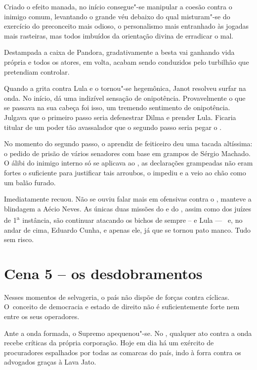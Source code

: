 Criado o efeito manada, no início consegue"-se manipular a coesão contra
o inimigo comum, levantando o grande véu debaixo do qual misturam"-se do
exercício do preconceito mais odioso, o personalismo mais entranhado às
jogadas mais rasteiras, mas todos imbuídos da orientação divina de
erradicar o mal.

Destampada a caixa de Pandora, gradativamente a besta vai ganhando vida
própria e todos os atores, em volta, acabam sendo conduzidos pelo
turbilhão que pretendiam controlar.

Quando a grita contra Lula e o  tornou"-se hegemônica, Janot resolveu
surfar na onda. No início, dá uma indizível sensação de onipotência.
Provavelmente o que se passava na sua cabeça foi isso, um tremendo
sentimento de onipotência. Julgava que o primeiro passo seria
defenestrar Dilma e prender Lula. Ficaria titular de um poder tão
avassalador que o segundo passo seria pegar o .

No momento do segundo passo, o aprendiz de feiticeiro deu uma tacada
altíssima: o pedido de prisão de vários senadores com base em grampos de
Sérgio Machado. O álibi do inimigo interno só se aplicava ao , as
declarações grampeadas não eram fortes o suficiente para justificar tais
arroubos, o  impediu e a  veio ao chão como um balão furado.

Imediatamente recuou. Não se ouviu falar mais em ofensivas contra o
, manteve a blindagem a Aécio Neves. As únicas duas missões do  e
do , assim como dos juízes de 1\textsuperscript{a~}instância, são
continuar atacando os bichos de sempre --  e Lula --- ~e, no andar de
cima, Eduardo Cunha, e apenas ele, já que se tornou pato manco. Tudo sem
risco.

\section{Cena 5 -- os desdobramentos}

Nesses momentos de selvageria, o país não dispõe de forças contra
cíclicas. O~conceito de democracia e estado de direito não é
suficientemente forte nem entre os seus operadores.

Ante a onda formada, o Supremo apequenou"-se. No , qualquer ato contra
a onda recebe críticas da própria corporação. Hoje em dia há um exército
de procuradores espalhados por todas as comarcas do país, indo à forra
contra os advogados graças à Lava Jato.

